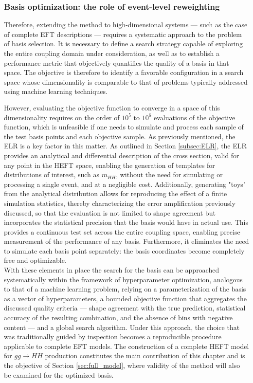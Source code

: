 \subsubsection{Basis optimization: the role of event-level reweighting}
Therefore, extending the method to high-dimensional systems — such as the case of complete EFT descriptions — requires a systematic approach to the problem of basis selection. It is necessary to define a search strategy capable of exploring the entire coupling domain under consideration, as well as to establish a performance metric that objectively quantifies the quality of a basis in that space. The objective is therefore to identify a favorable configuration in a search space whose dimensionality is comparable to that of problems typically addressed using machine learning techniques.

However, evaluating the objective function to converge in a space of this dimensionality requires on the order of $10^5$ to $10^6$ evaluations of the objective function, which is unfeasible if one needs to simulate and process each sample of the test basis points and each objective sample. As previously mentioned, the ELR is a key factor in this matter. As outlined in Section \ref{subsec:ELR}, the ELR provides an analytical and differential description of the cross section, valid for any point in the HEFT space, enabling the generation of templates for distributions of interest, such as $m_{HH}$, without the need for simulating or processing a single event, and at a negligible cost. Additionally, generating "toys" from the analytical distribution allows for reproducing the effect of a finite simulation statistics, thereby characterizing the error amplification previously discussed, so that the evaluation is not limited to shape agreement but incorporates the statistical precision that the basis would have in actual use. This provides a continuous test set across the entire coupling space, enabling precise measurement of the performance of any basis. Furthermore, it eliminates the need to simulate each basis point separately: the basis coordinates become completely free and optimizable.\\

With these elements in place the search for the basis can be approached systematically within the framework of hyperparameter optimization, analogous to that of a machine learning problem, relying on a parameterization of the basis as a vector of hyperparameters, a bounded objective function that aggregates the discussed quality criteria — shape agreement with the true prediction, statistical accuracy of the resulting combination, and the absence of bins with negative content — and a global search algorithm. Under this approach, the choice that was traditionally guided by inspection becomes a reproducible procedure applicable to complete EFT models. The construction of a complete HEFT model for $gg\to HH$ production constitutes the main contribution of this chapter and is the objective of Section \ref{sec:full_model}, where validity of the method will also be examined for the optimized basis.

